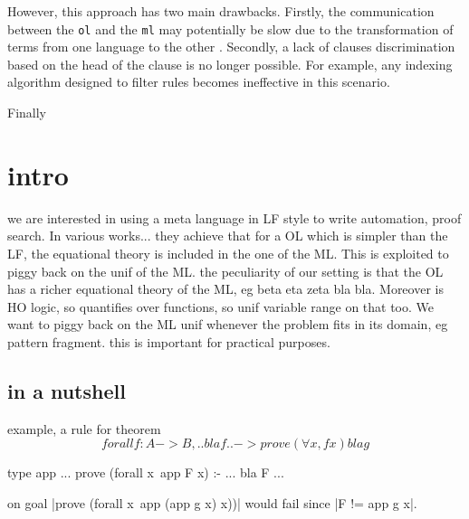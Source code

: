 \documentclass[acmengage]{acmart}
\newcommand*{\acronym}[1]{\texttt{#1}\xspace}
\def\ol{\acronym{ol}} %
\def\ml{\acronym{ml}} %
\begin{document}
However, this approach has two main drawbacks. Firstly, the communication
between the \ol and the \ml may potentially be slow due to the transformation of
terms from one language to the other . Secondly, a lack of %
clauses discrimination based on the head of the clause is no longer
possible. For example, any indexing
algorithm designed to filter rules becomes ineffective in this scenario.

Finally 




  
\section{intro}

we are interested in using a meta language in LF style to write
automation, proof search. In various works... they achieve that
for a OL which is simpler than the LF, the equational theory is included
in the one of the ML. This is exploited to piggy back on the unif
of the ML.
the peculiarity of our setting is that the OL has a richer equational
theory of the ML, eg beta eta zeta bla bla. Moreover is HO logic, so
quantifies over functions, so unif variable range on that too.
We want to piggy back on the ML unif whenever the problem fits
in its domain, eg pattern fragment.
this is important for practical purposes.

\subsection{in a nutshell}
example, a rule for theorem
$$
forall f : A -> B, .. bla f .. -> prove (\forall x, f x)
bla g
$$
\begin{elpicode}
type app ...
prove (forall x\ app F x) :- ... bla F ...
\end{elpicode}
on goal |prove (forall x\ app (app g x) x))|
would fail since |F != app g x|.
\end{document}

